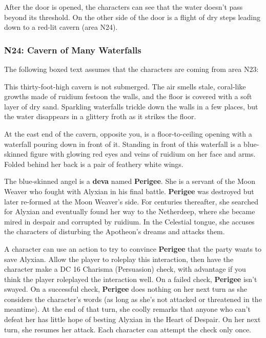 \documentclass[10pt,a4paper,twoside,bg=print,twocolumn,openany,nodeprecatedcode]{dndbook}
\begin{document}
After the door is opened, the characters can see that the water doesn't pass beyond its threshold. On the other side of the door is a flight of dry steps leading down to a red-lit cavern (area N24).

\subsubsection{N24: Cavern of Many Waterfalls}
The following boxed text assumes that the characters are coming from area N23:

\begin{DndReadAloud}{}
This thirty-foot-high cavern is not submerged. The air smells stale, coral-like growths made of ruidium festoon the walls, and the floor is covered with a soft layer of dry sand. Sparkling waterfalls trickle down the walls in a few places, but the water disappears in a glittery froth as it strikes the floor.

At the east end of the cavern, opposite you, is a floor-to-ceiling opening with a waterfall pouring down in front of it. Standing in front of this waterfall is a blue-skinned figure with glowing red eyes and veins of ruidium on her face and arms. Folded behind her back is a pair of feathery white wings.

\end{DndReadAloud}

The blue-skinned angel is a \textbf{deva} named \textbf{Perigee}. She is a servant of the Moon Weaver who fought with Alyxian in his final battle. \textbf{Perigee} was destroyed but later re-formed at the Moon Weaver's side. For centuries thereafter, she searched for Alyxian and eventually found her way to the Netherdeep, where she became mired in despair and corrupted by ruidium. In the Celestial tongue, she accuses the characters of disturbing the Apotheon's dreams and attacks them.

A character can use an action to try to convince \textbf{Perigee} that the party wants to save Alyxian. Allow the player to roleplay this interaction, then have the character make a DC 16 Charisma (Persuasion) check, with advantage if you think the player roleplayed the interaction well. On a failed check, \textbf{Perigee} isn't swayed. On a successful check, \textbf{Perigee} does nothing on her next turn as she considers the character's words (as long as she's not attacked or threatened in the meantime). At the end of that turn, she coolly remarks that anyone who can't defeat her has little hope of besting Alyxian in the Heart of Despair. On her next turn, she resumes her attack. Each character can attempt the check only once.
\end{document}
